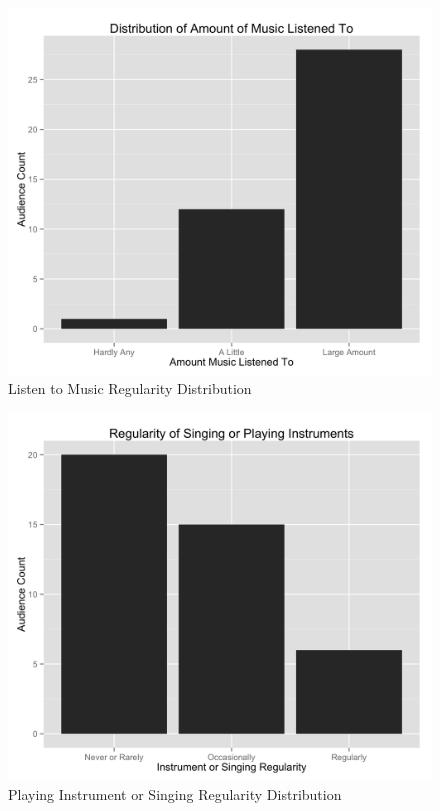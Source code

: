 \begin{figure}
    \centering
    \includegraphics[width=1.0\linewidth]{../study-2/results/graphs/music.png}
    \caption{Listen to Music Regularity Distribution}
    \label{musicdistribution}
\end{figure}

\begin{figure}
    \centering
    \includegraphics[width=1.0\linewidth]{../study-2/results/graphs/instrument-regularity.png}
    \caption{Playing Instrument or Singing Regularity Distribution}
    \label{instrumentdistribution}
\end{figure}



